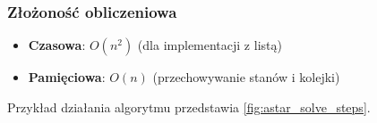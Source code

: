 \documentclass[../../../../doc.tex]{subfiles}
\begin{document}
\subsubsection{Złożoność obliczeniowa}
\begin{itemize}
  \item \textbf{Czasowa}: $O(n^2)$ (dla implementacji z listą)
  \item \textbf{Pamięciowa}: $O(n)$ (przechowywanie stanów i kolejki)
\end{itemize}
Przykład działania algorytmu przedstawia \cref{fig:astar_solve_steps}.

\begin{multicols}{2}
  
\end{multicols}
\end{document}
